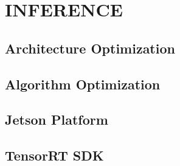 \chapter{INFERENCE}

\renewcommand{\headrulewidth}{0.5pt}
\renewcommand{\footrulewidth}{0.5pt}
\thispagestyle{plain}
\pagestyle{fancy}
\fancyhf{}
\raggedright
{}

\section{Architecture Optimization}

\section{Algorithm Optimization}

\section{Jetson Platform}

\section{TensorRT SDK}
